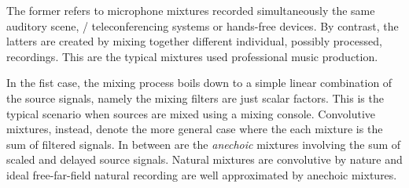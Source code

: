 The former refers to microphone mixtures recorded simultaneously the same auditory scene, \eg/ teleconferencing systems or hands-free devices.
By contrast, the latters are created by mixing together different individual, possibly processed, recordings.
This are the typical mixtures used professional music production.

In the fist case, the mixing process boils down to a simple linear combination of the source signals, namely
the mixing filters are just scalar factors.
This is the typical scenario when sources are mixed using a mixing console.
Convolutive mixtures, instead, denote the more general case where the each mixture is the sum of filtered signals.
In between are the \textit{anechoic} mixtures involving the sum of scaled and delayed source signals.
Natural mixtures are convolutive by nature and ideal free-far-field natural recording are well approximated by anechoic mixtures.


